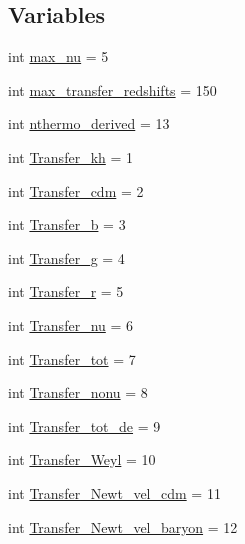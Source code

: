 \subsection*{Variables}
\begin{DoxyCompactItemize}
\item 
int \mbox{\hyperlink{namespacecamb_1_1model_aa5aed77e19cbb25b308fbdd5e9cea419}{max\+\_\+nu}} = 5
\item 
int \mbox{\hyperlink{namespacecamb_1_1model_a6ade1c0c099a154372e36f16c45e6340}{max\+\_\+transfer\+\_\+redshifts}} = 150
\item 
int \mbox{\hyperlink{namespacecamb_1_1model_af82d103a5c9f3263207726a866c81951}{nthermo\+\_\+derived}} = 13
\item 
int \mbox{\hyperlink{namespacecamb_1_1model_a287714e4a7ae72477574c98616a855d6}{Transfer\+\_\+kh}} = 1
\item 
int \mbox{\hyperlink{namespacecamb_1_1model_abf8e3442484719b05f004bb222a24cd1}{Transfer\+\_\+cdm}} = 2
\item 
int \mbox{\hyperlink{namespacecamb_1_1model_ad4ed5265fee32408266e398f4fa3ccf3}{Transfer\+\_\+b}} = 3
\item 
int \mbox{\hyperlink{namespacecamb_1_1model_a194468e27a53d01f00370408fc89f4d2}{Transfer\+\_\+g}} = 4
\item 
int \mbox{\hyperlink{namespacecamb_1_1model_a48f6c4424a193b64c94c762d72d7c2b0}{Transfer\+\_\+r}} = 5
\item 
int \mbox{\hyperlink{namespacecamb_1_1model_a668c967b7f14457cbbd288982896b17d}{Transfer\+\_\+nu}} = 6
\item 
int \mbox{\hyperlink{namespacecamb_1_1model_a1b3f04a0c673db56c42e7f01da499a4d}{Transfer\+\_\+tot}} = 7
\item 
int \mbox{\hyperlink{namespacecamb_1_1model_a42c64d4fcb781aecc70a497619807d42}{Transfer\+\_\+nonu}} = 8
\item 
int \mbox{\hyperlink{namespacecamb_1_1model_a85bbc866e588482cb831f602affcc0d6}{Transfer\+\_\+tot\+\_\+de}} = 9
\item 
int \mbox{\hyperlink{namespacecamb_1_1model_aab74f6a5e35493355b57fd911de6efec}{Transfer\+\_\+\+Weyl}} = 10
\item 
int \mbox{\hyperlink{namespacecamb_1_1model_a672bcb7c7aade0df5e95a4bfa429bd22}{Transfer\+\_\+\+Newt\+\_\+vel\+\_\+cdm}} = 11
\item 
int \mbox{\hyperlink{namespacecamb_1_1model_ac245ef0f5a6e69c9652405e34469bb81}{Transfer\+\_\+\+Newt\+\_\+vel\+\_\+baryon}} = 12
\item 

\end{DoxyCompactItemize}
